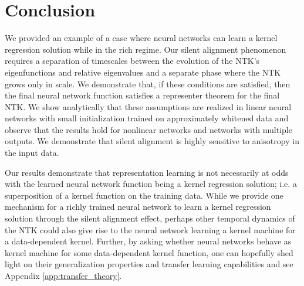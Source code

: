 \documentclass{article} %
\begin{document}




\section{Conclusion}

We provided an example of a case where neural networks can learn a kernel regression solution while in the rich regime. Our silent alignment phenomenon requires a separation of timescales between the evolution of the NTK's eigenfunctions and relative eigenvalues and a separate phase where the NTK grows only in scale. We demonstrate that, if these conditions are satisfied, then the final neural network function satisfies a representer theorem for the final NTK. We show analytically that these assumptions are realized in linear neural networks with small initialization trained on approximately whitened data and observe that the results hold for nonlinear networks and networks with multiple outputs. We demonstrate that silent alignment is highly sensitive to anisotropy in the input data.

Our results demonstrate that representation learning is not necessarily at odds with the learned neural network function being a kernel regression solution; i.e. a superposition of a kernel function on the training data. While we provide one mechanism for a richly trained neural network to learn a kernel regression solution through the silent alignment effect, perhaps other temporal dynamics of the NTK could also give rise to the neural network learning a kernel machine for a data-dependent kernel. Further, by asking whether neural networks behave as kernel machine for some data-dependent kernel function, one can hopefully shed light on their generalization properties and transfer learning capabilities \citep{ bordelon_icml_learning_curve, Canatar2021SpectralBA,loureiro_lenka_feature_maps, GEIGER20211} and see Appendix \ref{app:transfer_theory}.
\end{document}
